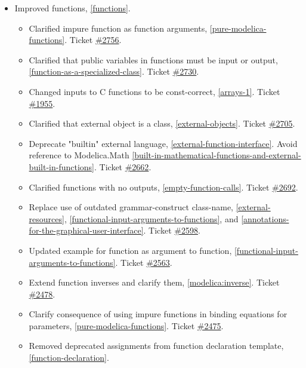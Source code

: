 \begin{itemize}
\item Improved functions, \cref{functions}.
\begin{itemize}
\item Clarified impure function as function arguments, \cref{pure-modelica-functions}.
Ticket \href{https://github.com/modelica/ModelicaSpecification/issues/2756}{\#2756}.
\item Clarified that public variables in functions must be input or output, \cref{function-as-a-specialized-class}.
Ticket \href{https://github.com/modelica/ModelicaSpecification/issues/2730}{\#2730}.
\item Changed inputs to C functions to be const-correct, \cref{arrays-1}.
Ticket \href{https://github.com/modelica/ModelicaSpecification/issues/1955}{\#1955}.
\item Clarified that external object is a class, \cref{external-objects}.
Ticket \href{https://github.com/modelica/ModelicaSpecification/issues/2705}{\#2705}.
\item Deprecate "builtin" external language, \cref{external-function-interface}.
Avoid reference to Modelica.Math \cref{built-in-mathematical-functions-and-external-built-in-functions}.
Ticket \href{https://github.com/modelica/ModelicaSpecification/issues/2662}{\#2662}.
\item Clarified functions with no outputs, \cref{empty-function-calls}.
Ticket \href{https://github.com/modelica/ModelicaSpecification/pull/2692}{\#2692}.
\item Replace use of outdated grammar-construct class-name, \cref{external-resources}, \cref{functional-input-arguments-to-functions}, and \cref{annotations-for-the-graphical-user-interface}.
Ticket \href{https://github.com/modelica/ModelicaSpecification/pull/2598}{\#2598}.
\item Updated example for function as argument to function, \cref{functional-input-arguments-to-functions}.
Ticket \href{https://github.com/modelica/ModelicaSpecification/issues/2563}{\#2563}.
\item Extend function inverses and clarify them, \cref{modelica:inverse}.
Ticket \href{https://github.com/modelica/ModelicaSpecification/pull/2478}{\#2478}.
\item Clarify consequence of using impure functions in binding equations for parameters, \cref{pure-modelica-functions}.
Ticket \href{https://github.com/modelica/ModelicaSpecification/pull/2475}{\#2475}.
\item Removed deprecated assignments from function declaration template, \cref{function-declaration}.

\end{itemize}
\end{itemize}
